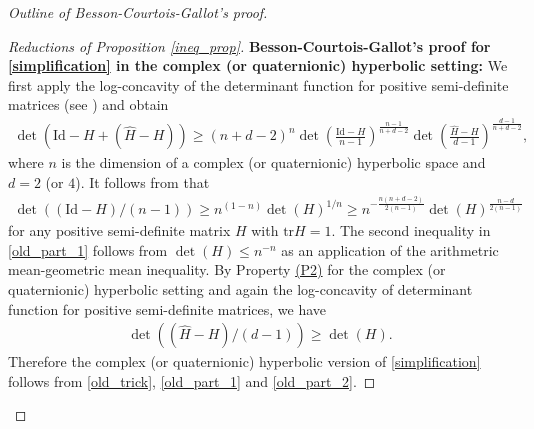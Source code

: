 \documentclass{article}
\newcommand{\id}{\mathrm{Id}}
\newcommand{\tr}{\mathrm{tr}}
\theoremstyle{definition}
\begin{document}
\begin{proof}[Outline of Besson-Courtois-Gallot's proof]
\begin{proof}[Reductions of Proposition \ref{ineq_prop}]
\textbf{\hypertarget{BCG's proof sketch}{Besson-Courtois-Gallot's proof} for \eqref{simplification} in the complex (or quaternionic) hyperbolic setting: }We first apply the log-concavity of the determinant function for positive semi-definite matrices (see \cite[B.2 Lemme]{BCG1}) and obtain
\begin{align}\label{old_trick}
\det(\id-H+(\widehat{H}-H))\geq (n+d-2)^{n}\det\left(\frac{\id-H}{n-1}\right)^{\frac{n-1}{n+d-2}}\det\left(\frac{\widehat{H}-H}{d-1}\right)^{\frac{d-1}{n+d-2}},
\end{align}
where $n$ is the dimension of a complex (or quaternionic) hyperbolic space and $d=2$ (or $4$). It follows from \cite[B.4 Lemme]{BCG1} that 
\begin{align}\label{old_part_1}
\det((\id-H)/(n-1))\geq n^{(1-n)}\det(H)^{1/n}\geq n^{-\frac{n(n+d-2)}{2(n-1)}}\det(H)^{\frac{n-d}{2(n-1)}}
\end{align}
 for any positive semi-definite matrix $H$ with $\tr H=1$. The second inequality in \eqref{old_part_1} follows from $\det(H)\leq n^{-n}$ as an application of the arithmetric mean-geometric mean inequality. By Property \hyperlink{P2}{(P2)} for the complex (or quaternionic) hyperbolic setting and again the log-concavity of determinant function for positive semi-definite matrices, we have
\begin{align}\label{old_part_2}\det((\widehat H-H)/(d-1))\geq \det(H).\end{align}
Therefore the complex (or quaternionic) hyperbolic version of \eqref{simplification} follows from \eqref{old_trick}, \eqref{old_part_1} and \eqref{old_part_2}. 



\end{proof}
\end{proof}
\end{document}
